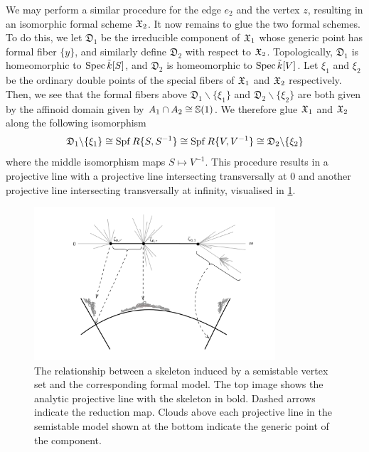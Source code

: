 We may perform a similar procedure for the edge $e_2$ and the vertex $z$, resulting in an isomorphic formal scheme $\mathfrak{X}_2$.
It now remains to glue the two formal schemes.
To do this, we let $\mathfrak{D}_1$ be the irreducible component of $\mathfrak{X}_1$ whose generic point has formal fiber $\{y\}$, and similarly define $\mathfrak{D}_2$ with respect to $\mathfrak{X}_2$.
Topologically, $\mathfrak{D}_1$ is homeomorphic to $\operatorname{Spec} \tilde{k}[S]$, and $\mathfrak{D}_2$ is homeomorphic to $\operatorname{Spec} \tilde{k}[V]$.
Let $\xi_1$ and $\xi_2$ be the ordinary double points of the special fibers of $\mathfrak{X}_1$ and $\mathfrak{X}_2$ respectively.
Then, we see that the formal fibers above $\mathfrak{D}_1 \backslash \{ \xi_1 \}$ and $\mathfrak{D}_2 \backslash \{ \xi_2 \}$ are both given by the affinoid domain given by $A_1 \cap A_2 \cong \mathbb{S}(1)$.
We therefore glue $\mathfrak{X}_1$ and $\mathfrak{X}_2$ along the following isomorphism
\[
\mathfrak{D}_1 \backslash \{ \xi_1 \} \cong \operatorname{Spf} R\{S, S^{-1}\} \cong \operatorname{Spf} R\{V, V^{-1}\} \cong \mathfrak{D}_2 \backslash \{ \xi_2 \}
\] 
where the middle isomorphism maps $S \mapsto V^{-1}$.
This procedure results in a projective line with a projective line intersecting transversally at $0$ and another projective line intersecting transversally at infinity, visualised in \cref{fig:semistable}.

\begin{figure}
    \centering
    \includegraphics[width=0.8\textwidth]{Images/semistable.png}
    \caption{The relationship between a skeleton induced by a semistable vertex set and the corresponding formal model. The top image shows the analytic projective line with the skeleton in bold. Dashed arrows indicate the reduction map. 
    Clouds above each projective line in the semistable model shown at the bottom indicate the generic point of the component.}
    \label{fig:semistable}
\end{figure}

